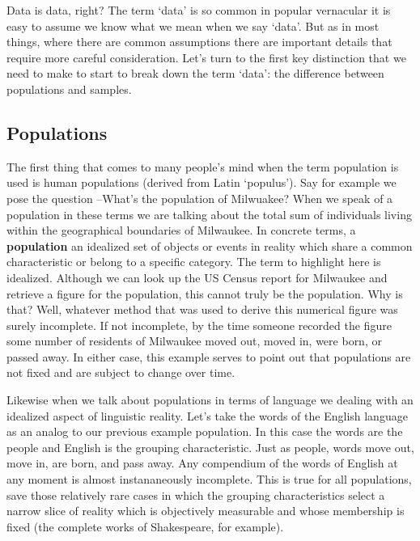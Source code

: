 \documentclass[
  letterpaper,
  DIV=11,
  numbers=noendperiod]{scrreport}
\theoremstyle{definition}
\theoremstyle{remark}
\begin{document}
Data is data, right? The term `data' is so common in popular vernacular
it is easy to assume we know what we mean when we say `data'. But as in
most things, where there are common assumptions there are important
details that require more careful consideration. Let's turn to the first
key distinction that we need to make to start to break down the term
`data': the difference between populations and samples.

\hypertarget{sec-ud-populations}{%
\subsection{Populations}\label{sec-ud-populations}}

The first thing that comes to many people's mind when the term
population is used is human populations (derived from Latin `populus').
Say for example we pose the question --What's the population of
Milwuakee? When we speak of a population in these terms we are talking
about the total sum of individuals living within the geographical
boundaries of Milwaukee. In concrete terms, a
\textbf{population} an idealized set of objects or
events in reality which share a common characteristic or belong to a
specific category. The term to highlight here is idealized. Although we
can look up the US Census report for Milwaukee and retrieve a figure for
the population, this cannot truly be the population. Why is that? Well,
whatever method that was used to derive this numerical figure was surely
incomplete. If not incomplete, by the time someone recorded the figure
some number of residents of Milwaukee moved out, moved in, were born, or
passed away. In either case, this example serves to point out that
populations are not fixed and are subject to change over time.

Likewise when we talk about populations in terms of language we dealing
with an idealized aspect of linguistic reality. Let's take the words of
the English language as an analog to our previous example population. In
this case the words are the people and English is the grouping
characteristic. Just as people, words move out, move in, are born, and
pass away. Any compendium of the words of English at any moment is
almost instananeously incomplete. This is true for all populations, save
those relatively rare cases in which the grouping characteristics select
a narrow slice of reality which is objectively measurable and whose
membership is fixed (the complete works of Shakespeare, for example).
\end{document}
